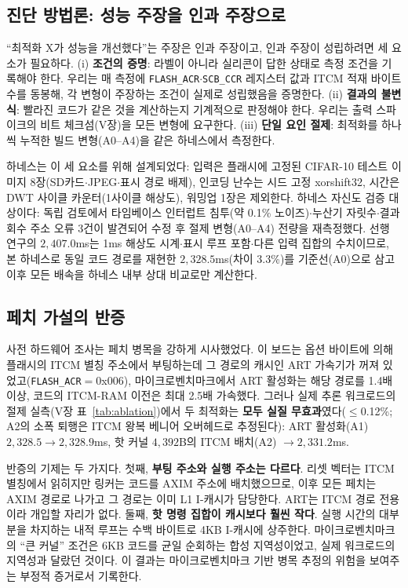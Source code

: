 \subsection{진단 방법론: 성능 주장을 인과 주장으로}\label{sec:method}

``최적화 X가 성능을 개선했다''는 주장은 인과 주장이고, 인과 주장이
성립하려면 세 요소가 필요하다. (i) \textbf{조건의 증명}: 라벨이
아니라 실리콘이 답한 상태로 측정 조건을 기록해야 한다. 우리는 매
측정에 \texttt{FLASH\_ACR}$\cdot$\texttt{SCB\_CCR} 레지스터 값과
ITCM 적재 바이트 수를 동봉해, 각 변형이 주장하는 조건이 실제로
성립했음을 증명한다. (ii) \textbf{결과의 불변식}: 빨라진 코드가
같은 것을 계산하는지 기계적으로 판정해야 한다. 우리는 출력
스파이크의 비트 체크섬(V장)을 모든 변형에 요구한다. (iii)
\textbf{단일 요인 절제}: 최적화를 하나씩 누적한 빌드
변형(A0--A4)을 같은 하네스에서 측정한다.

하네스는 이 세 요소를 위해 설계되었다: 입력은 플래시에 고정된
CIFAR-10 테스트 이미지 8장(SD카드$\cdot$JPEG$\cdot$표시 경로 배제),
인코딩 난수는 시드 고정 xorshift32, 시간은 DWT 사이클
카운터(1사이클 해상도), 워밍업 1장은 제외한다. 하네스 자신도 검증
대상이다: 독립 검토에서 타임베이스 인터럽트 침투(약 0.1\%
노이즈)$\cdot$누산기 자릿수$\cdot$결과 회수 주소 오류 3건이 발견되어
수정 후 절제 변형(A0--A4) 전량을 재측정했다. 선행 연구의 $2{,}407.0$ms는 1ms 해상도
시계$\cdot$표시 루프 포함$\cdot$다른 입력 집합의 수치이므로, 본
하네스로 동일 코드 경로를 재현한 $2{,}328.5$ms(차이 3.3\%)를
기준선(A0)으로 삼고 이후 모든 배속을 하네스 내부 상대 비교로만
계산한다.

\subsection{페치 가설의 반증}\label{sec:falsify}

사전 하드웨어 조사는 페치 병목을 강하게 시사했었다. 이 보드는 옵션
바이트에 의해 플래시의 ITCM 별칭 주소에서 부팅하는데 그 경로의
캐시인 ART 가속기가 꺼져 있었고(\texttt{FLASH\_ACR}$=$0x006),
마이크로벤치마크에서 ART 활성화는 해당 경로를 1.4배 이상, 코드의
ITCM-RAM 이전은 최대 2.5배 가속했다. 그러나 실제 추론 워크로드의
절제 실측(V장 표~\ref{tab:ablation})에서 두 최적화는 \textbf{모두
실질 무효과}였다($\le$0.12\%; A2의 소폭 퇴행은 ITCM 왕복 베니어
오버헤드로 추정된다): ART 활성화(A1)
$2{,}328.5\rightarrow2{,}328.9$ms, 핫 커널 $4{,}392$B의 ITCM
배치(A2) $\rightarrow2{,}331.2$ms.

반증의 기제는 두 가지다. 첫째, \textbf{부팅 주소와 실행 주소는
다르다}. 리셋 벡터는 ITCM 별칭에서 읽히지만 링커는 코드를 AXIM
주소에 배치했으므로, 이후 모든 페치는 AXIM 경로로 나가고 그 경로는
이미 L1 I-캐시가 담당한다. ART는 ITCM 경로 전용이라 개입할 자리가
없다. 둘째, \textbf{핫 명령 집합이 캐시보다 훨씬 작다}. 실행 시간의
대부분을 차지하는 내적 루프는 수백 바이트로 4KB I-캐시에 상주한다.
마이크로벤치마크의 ``큰 커널'' 조건은 6KB 코드를 균일 순회하는 합성
지역성이었고, 실제 워크로드의 지역성과 달랐던 것이다. 이 결과는
마이크로벤치마크 기반 병목 추정의 위험을 보여주는 부정적 증거로서
기록한다.

